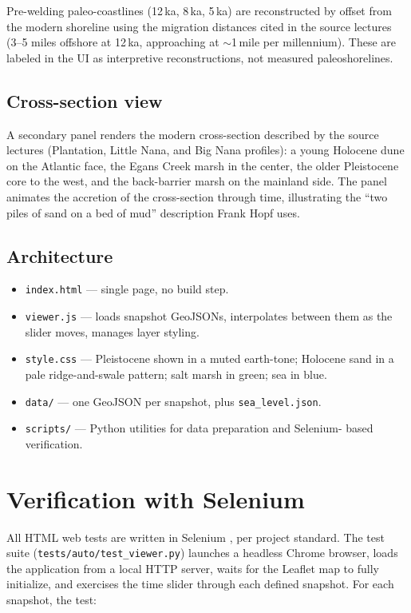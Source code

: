 \documentclass[11pt]{article}
\begin{document}
Pre-welding paleo-coastlines (12\,ka, 8\,ka, 5\,ka) are reconstructed by offset
from the modern shoreline using the migration distances cited in the source
lectures (3--5 miles offshore at 12\,ka, approaching at $\sim$1\,mile per
millennium). These are labeled in the UI as interpretive reconstructions, not
measured paleoshorelines.

\subsection{Cross-section view}
A secondary panel renders the modern cross-section described by the source
lectures (Plantation, Little Nana, and Big Nana profiles): a young Holocene dune
on the Atlantic face, the Egans Creek marsh in the center, the older Pleistocene
core to the west, and the back-barrier marsh on the mainland side. The panel
animates the accretion of the cross-section through time, illustrating the
``two piles of sand on a bed of mud'' description Frank Hopf uses.

\subsection{Architecture}
\begin{itemize}[leftmargin=2em]
\item \texttt{index.html} --- single page, no build step.
\item \texttt{viewer.js} --- loads snapshot GeoJSONs, interpolates between them as
the slider moves, manages layer styling.
\item \texttt{style.css} --- Pleistocene shown in a muted earth-tone; Holocene
sand in a pale ridge-and-swale pattern; salt marsh in green; sea in blue.
\item \texttt{data/} --- one GeoJSON per snapshot, plus \texttt{sea\_level.json}.
\item \texttt{scripts/} --- Python utilities for data preparation and Selenium-
based verification.
\end{itemize}

\section{Verification with Selenium}

All HTML web tests are written in Selenium \cite{selenium}, per project standard.
The test suite (\texttt{tests/auto/test\_viewer.py}) launches a headless Chrome
browser, loads the application from a local HTTP server, waits for the Leaflet
map to fully initialize, and exercises the time slider through each defined
snapshot. For each snapshot, the test:
\end{document}
